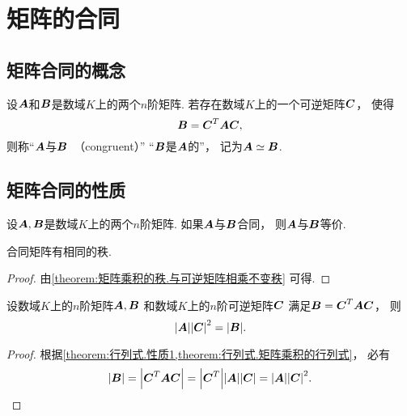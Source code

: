 \section{矩阵的合同}
\subsection{矩阵合同的概念}
\begin{definition}
设\(\boldsymbol{A}\)和\(\boldsymbol{B}\)是数域\(K\)上的两个\(n\)阶矩阵.
若存在数域\(K\)上的一个可逆矩阵\(\boldsymbol{C}\)，
使得\begin{equation*}
	\boldsymbol{B}=\boldsymbol{C}^T\boldsymbol{A}\boldsymbol{C},
\end{equation*}
则称“\(\boldsymbol{A}\)与\(\boldsymbol{B}\)~（congruent）”
“\(\boldsymbol{B}\)是\(\boldsymbol{A}\)的”，
记为\(\boldsymbol{A}\simeq\boldsymbol{B}\).
\end{definition}

\subsection{矩阵合同的性质}
\begin{property}
设\(\boldsymbol{A},\boldsymbol{B}\)是数域\(K\)上的两个\(n\)阶矩阵.
如果\(\boldsymbol{A}\)与\(\boldsymbol{B}\)合同，
则\(\boldsymbol{A}\)与\(\boldsymbol{B}\)等价.
\end{property}

\begin{property}
合同矩阵有相同的秩.
\begin{proof}
由\cref{theorem:矩阵乘积的秩.与可逆矩阵相乘不变秩} 可得.
\end{proof}
\end{property}

\begin{proposition}\label{theorem:矩阵合同.合同矩阵的行列式的关系}
设数域\(K\)上的\(n\)阶矩阵\(\boldsymbol{A},\boldsymbol{B}\)
和数域\(K\)上的\(n\)阶可逆矩阵\(\boldsymbol{C}\)
满足\(\boldsymbol{B} = \boldsymbol{C}^T \boldsymbol{A} \boldsymbol{C}\)，
则\begin{equation*}
	\abs{\boldsymbol{A}} \abs{\boldsymbol{C}}^2
	= \abs{\boldsymbol{B}}.
\end{equation*}
\begin{proof}
根据\cref{theorem:行列式.性质1,theorem:行列式.矩阵乘积的行列式}，
必有\begin{equation*}
	\abs{\boldsymbol{B}}
	= \abs{\boldsymbol{C}^T \boldsymbol{A} \boldsymbol{C}}
	= \abs{\boldsymbol{C}^T} \abs{\boldsymbol{A}} \abs{\boldsymbol{C}}
	= \abs{\boldsymbol{A}} \abs{\boldsymbol{C}}^2.
	\qedhere
\end{equation*}
\end{proof}
\end{proposition}

